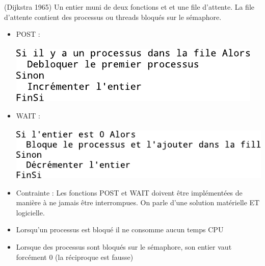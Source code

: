  (Dijkstra 1965) Un entier muni de deux fonctions  et  et une file d'attente. La file d'attente contient des processus ou threads bloqués sur le sémaphore. \\
\begin{itemize}
	\item POST : \\
\\ \includegraphics{fig14.pdf}
	\item WAIT : \\
\\ \includegraphics{fig15.pdf}
	\item Contrainte : Les fonctions POST et WAIT doivent être implémentées de manière à ne jamais être interrompues. On parle d'une solution matérielle ET logicielle.
	\item Lorsqu'un processus est bloqué il ne consomme aucun temps CPU
	\item Lorsque des processus sont bloqués sur le sémaphore, son entier vaut forcément 0 (la réciproque est fausse)
\end{itemize}

